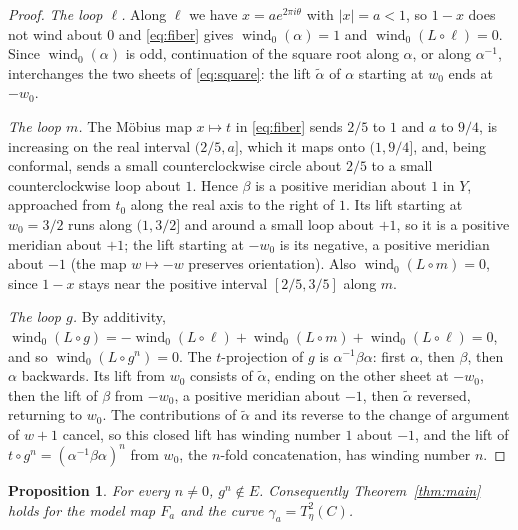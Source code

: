 \documentclass[11pt]{article}
\newcommand{\wind}{\operatorname{wind}}
\newtheorem{proposition}[theorem]{Proposition}
\theoremstyle{remark}
\numberwithin{equation}{section}
\begin{document}
\begin{proof}
\emph{The loop $\ell$.} Along $\ell$ we have $x=ae^{2\pi i\theta}$ with
$|x|=a<1$, so $1-x$ does not wind about $0$ and \eqref{eq:fiber} gives
$\wind_0(\alpha)=1$ and $\wind_0(L\circ\ell)=0$. Since $\wind_0(\alpha)$
is odd, continuation of the square root along
$\alpha$, or along $\alpha^{-1}$, interchanges the two sheets of
\eqref{eq:square}: the lift $\tilde\alpha$ of $\alpha$ starting at $w_0$
ends at $-w_0$.

\emph{The loop $m$.} The M\"obius map $x\mapsto t$ in \eqref{eq:fiber}
sends $2/5$ to $1$ and $a$ to $9/4$, is increasing on the real interval
$(2/5,a]$, which it maps onto $(1,9/4]$, and, being conformal, sends a
small counterclockwise circle about $2/5$ to a small counterclockwise loop
about $1$. Hence $\beta$ is a positive meridian about $1$ in $Y$,
approached from $t_0$ along the real axis to the right of $1$. Its lift
starting at $w_0=3/2$ runs along $(1,3/2]$ and around a small loop about
$+1$, so it is a positive meridian about $+1$; the lift starting at $-w_0$
is its negative, a positive meridian about $-1$ (the map $w\mapsto-w$
preserves orientation). Also $\wind_0(L\circ m)=0$, since $1-x$ stays near
the positive interval $[2/5,3/5]$ along $m$.

\emph{The loop $g$.} By additivity,
$\wind_0(L\circ g)=-\wind_0(L\circ\ell)+\wind_0(L\circ m)+\wind_0(L\circ\ell)=0$,
and so $\wind_0(L\circ g^n)=0$. The $t$-projection of $g$ is
$\alpha^{-1}\beta\alpha$: first $\alpha$, then $\beta$, then $\alpha$
backwards. Its lift from $w_0$ consists of $\tilde\alpha$, ending on the
other sheet at $-w_0$, then the lift of $\beta$ from $-w_0$, a positive
meridian about $-1$, then $\tilde\alpha$ reversed, returning to $w_0$. The
contributions of $\tilde\alpha$ and its reverse to the change of argument
of $w+1$ cancel, so this closed lift has winding number $1$ about $-1$,
and the lift of $t\circ g^n=(\alpha^{-1}\beta\alpha)^n$ from $w_0$, the
$n$-fold concatenation, has winding number $n$.
\end{proof}

\begin{proposition}\label{prop:notinE}
For every $n\ne0$, $g^n\notin E$. Consequently Theorem~\ref{thm:main}
holds for the model map $F_a$ and the curve $\gamma_a=T_\eta^2(C)$.
\end{proposition}
\end{document}
